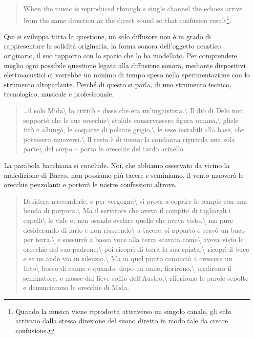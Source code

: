 \documentclass[a4paper,11pt]{article}
\begin{document}
\begin{quote}
When the music is reproduced through a single channel the echoes
arrive from the same direction as the direct sound so that confusion
result\footnote{Quando la musica viene riprodotta attraverso un singolo canale,
gli echi arrivano dalla stessa direzione del suono diretto in modo
tale da creare confusione.}.
\end{quote}

Qui si sviluppa tutta la questione, un solo diffusore non è in grado di
rappresentare la solidità originaria, la forma sonora dell'oggetto
acustico originario, il suo rapporto con lo spazio che lo ha modellato.
Per comprendere meglio ogni possibile questione legata alla diffusione
sonora, mediante dispositivi elettroacustici ci vorrebbe un minimo di
tempo speso nella sperimentazione con lo strumento altoparlante. Perché
di questo si parla, di uno strumento tecnico, tecnologico, musicale e
profesisonale.

\begin{quote}
\ldots{}il solo Mida\textbackslash{}
lo criticò e disse che era un'ingiustizia.\textbackslash{}
Il dio di Delo non sopportò che le sue orecchie\textbackslash{}
stolide conservassero figura umana,\textbackslash{}
gliele tirò e allungò, le cosparse di pelame grigio,\textbackslash{}
le rese instabili alla base, che potessero muoversi.\textbackslash{}
Il resto è di uomo; la condanna riguarda una sola parte\textbackslash{}
del corpo -- porta le orecchie del tardo asinello.
\end{quote}

La parabola bacchiana si conclude. Noi, che abbiamo osservato da vicino
la maledizione di Bacco, non possiamo più tacere e seminiamo, il vento
muoverà le orecchie penzolanti e porterà le nostre confessioni altrove.

\begin{quote}
Desidera nasconderle, e per vergogna\textbackslash{}
si prova a coprire le tempie con una benda di porpora.\textbackslash{}
Ma il servitore che aveva il compito di tagliargli i capelli\textbackslash{}
le vide e, non osando svelare quello che aveva visto,\textbackslash{}
ma pure desiderando di farlo e non riuscendo\textbackslash{}
a tacere, si appartò e scavò un buco per terra,\textbackslash{}
e sussurrò a bassa voce alla terra scavata come\textbackslash{}
aveva visto le orecchie del suo padrone;\textbackslash{}
poi ricoprì di terra la sua spiata,\textbackslash{}
ricoprì il buco e se ne andò via in silenzio.\textbackslash{}
Ma in quel punto cominciò a crescere un fitto\textbackslash{}
bosco di canne e quando, dopo un anno, fiorirono,\textbackslash{}
tradirono il seminatore, e mosse dal lieve soffio dell'Austro,\textbackslash{}
riferirono le parole sepolte e denunciarono le orecchie di Mida.
\end{quote}
\end{document}
